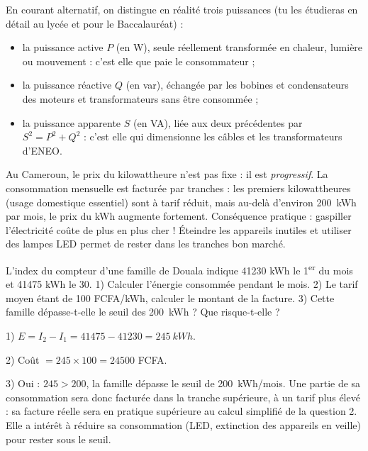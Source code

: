 \documentclass[11pt]{article}
\newcommand{\cle}[1]{{\popxbold\color{popdark}#1}}
\begin{document}
\begin{savaistu}
En courant alternatif, on distingue en réalité trois puissances (tu les étudieras en détail au lycée et pour le Baccalauréat) :
\begin{itemize}
\item la puissance \cle{active} $P$ (en W), seule réellement transformée en chaleur, lumière ou mouvement : c'est elle que paie le consommateur ;
\item la puissance \cle{réactive} $Q$ (en var), échangée par les bobines et condensateurs des moteurs et transformateurs sans être consommée ;
\item la puissance \cle{apparente} $S$ (en VA), liée aux deux précédentes par $S^2 = P^2 + Q^2$ : c'est elle qui dimensionne les câbles et les transformateurs d'ENEO.
\end{itemize}
Au Cameroun, le prix du kilowattheure n'est pas fixe : il est \emph{progressif}. La consommation mensuelle est facturée par tranches : les premiers kilowattheures (usage domestique essentiel) sont à tarif réduit, mais au-delà d'environ \SI{200}{kWh} par mois, le prix du kWh augmente fortement. Conséquence pratique : gaspiller l'électricité coûte de plus en plus cher ! Éteindre les appareils inutiles et utiliser des lampes LED permet de rester dans les tranches bon marché.
\end{savaistu}

\begin{exercice}
L'index du compteur d'une famille de Douala indique \num{41230} kWh le 1\textsuperscript{er} du mois et \num{41475} kWh le 30. 1) Calculer l'énergie consommée pendant le mois. 2) Le tarif moyen étant de 100 FCFA/kWh, calculer le montant de la facture. 3) Cette famille dépasse-t-elle le seuil des \SI{200}{kWh} ? Que risque-t-elle ?
\end{exercice}

\begin{corrige}
1) $E = I_2 - I_1 = \num{41475} - \num{41230} = \SI{245}{kWh}$.

2) Coût $= 245 \times 100 = \num{24500}$ FCFA.

3) Oui : $245 > 200$, la famille dépasse le seuil de \SI{200}{kWh/mois}. Une partie de sa consommation sera donc facturée dans la tranche supérieure, à un tarif plus élevé : sa facture réelle sera en pratique supérieure au calcul simplifié de la question 2. Elle a intérêt à réduire sa consommation (LED, extinction des appareils en veille) pour rester sous le seuil.
\end{corrige}
\end{document}
